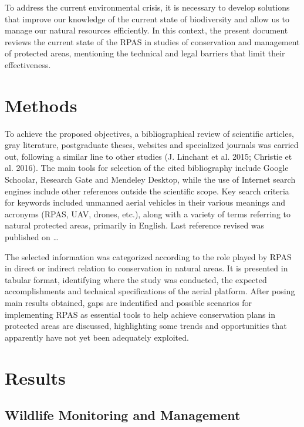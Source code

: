 \documentclass[]{interact}
\theoremstyle{plain}%
\theoremstyle{definition}
\theoremstyle{remark}
\begin{document}
To address the current environmental crisis, it is necessary to develop
solutions that improve our knowledge of the current state of
biodiversity and allow us to manage our natural resources efficiently.
In this context, the present document reviews the current state of the
RPAS in studies of conservation and management of protected areas,
mentioning the technical and legal barriers that limit their
effectiveness.

\section{Methods}\label{methods}

To achieve the proposed objectives, a bibliographical review of
scientific articles, gray literature, postgraduate theses, websites and
specialized journals was carried out, following a similar line to other
studies (J. Linchant et al. 2015; Christie et al. 2016). The main tools
for selection of the cited bibliography include Google Schoolar,
Research Gate and Mendeley Desktop, while the use of Internet search
engines include other references outside the scientific scope. Key
search criteria for keywords included unmanned aerial vehicles in their
various meanings and acronyms (RPAS, UAV, drones, etc.), along with a
variety of terms referring to natural protected areas, primarily in
English. Last reference revised was published on \ldots{}

The selected information was categorized according to the role played by
RPAS in direct or indirect relation to conservation in natural areas. It
is presented in tabular format, identifying where the study was
conducted, the expected accomplishments and technical specifications of
the aerial platform. After posing main results obtained, gaps are
indentified and possible scenarios for implementing RPAS as essential
tools to help achieve conservation plans in protected areas are
discussed, highlighting some trends and opportunities that apparently
have not yet been adequately exploited.

\section{Results}\label{results}

\subsection{Wildlife Monitoring and
Management}\label{wildlife-monitoring-and-management}
\end{document}
